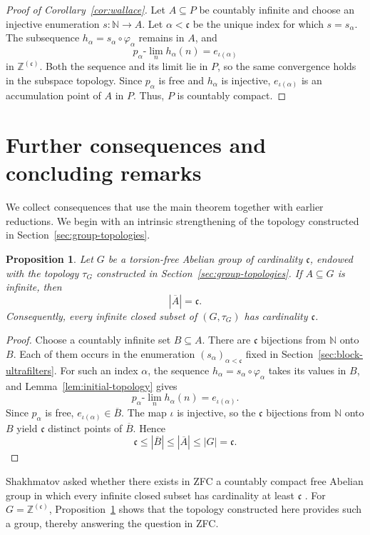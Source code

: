 \documentclass[11pt]{amsart}
\newtheorem{proposition}[theorem]{Proposition}
\theoremstyle{definition}
\newcommand{\N}{\mathbb N}
\newcommand{\Z}{\mathbb Z}
\newcommand{\cfrak}{\mathfrak c}
\begin{document}
\begin{proof}[Proof of Corollary~\ref{cor:wallace}]
Let $A\subseteq P$ be countably infinite and choose an injective enumeration
$s:\N\to A$.  Let $\alpha<\cfrak$ be the unique index for which
$s=s_\alpha$.  The subsequence
$h_\alpha=s_\alpha\circ\varphi_\alpha$ remains in $A$, and
\[
 p_\alpha\text{-}\lim_n h_\alpha(n)=e_{\iota(\alpha)}
\]
in $\Z^{(\cfrak)}$.  Both the sequence and its limit lie in $P$, so the same
convergence holds in the subspace topology.  Since $p_\alpha$ is free and
$h_\alpha$ is injective, $e_{\iota(\alpha)}$ is an accumulation point of
$A$ in $P$.
Thus, $P$ is countably compact.
\end{proof}

\section{Further consequences and concluding remarks}\label{sec:consequences}

We collect consequences that use the main theorem together with earlier
reductions.  We begin with an intrinsic strengthening of the topology
constructed in Section~\ref{sec:group-topologies}.

\begin{proposition}\label{prop:large-closures}
Let $G$ be a torsion-free Abelian group of cardinality $\cfrak$, endowed with
the topology $\tau_G$ constructed in
Section~\ref{sec:group-topologies}.  If $A\subseteq G$ is
infinite, then
\[
 |\overline A|=\cfrak.
\]
Consequently, every infinite closed subset of $(G,\tau_G)$ has cardinality
$\cfrak$.
\end{proposition}

\begin{proof}
Choose a countably infinite set $B\subseteq A$.  There are $\cfrak$ bijections
from $\N$ onto $B$.  Each of them occurs in the enumeration
$(s_\alpha)_{\alpha<\cfrak}$ fixed in Section~\ref{sec:block-ultrafilters}.
For such an index $\alpha$, the sequence
$h_\alpha=s_\alpha\circ\varphi_\alpha$ takes its values in $B$, and
Lemma~\ref{lem:initial-topology} gives
\[
 p_\alpha\text{-}\lim_n h_\alpha(n)=e_{\iota(\alpha)}.
\]
Since $p_\alpha$ is free, $e_{\iota(\alpha)}\in\overline B$.  The map $\iota$
is injective, so the $\cfrak$ bijections from $\N$ onto $B$ yield $\cfrak$
distinct points of $\overline B$.  Hence
\[
 \cfrak\leq |\overline B|
 \leq |\overline A|
 \leq |G|=\cfrak.
\]
\end{proof}

Shakhmatov asked whether there exists in ZFC a countably compact free Abelian
group in which every infinite closed subset has cardinality at least $\cfrak$
\cite[p.~13]{Shakhmatov2001}.  For $G=\Z^{(\cfrak)}$,
Proposition~\ref{prop:large-closures} shows that the topology constructed here
provides such a group, thereby answering the question in ZFC\@.
\end{document}
